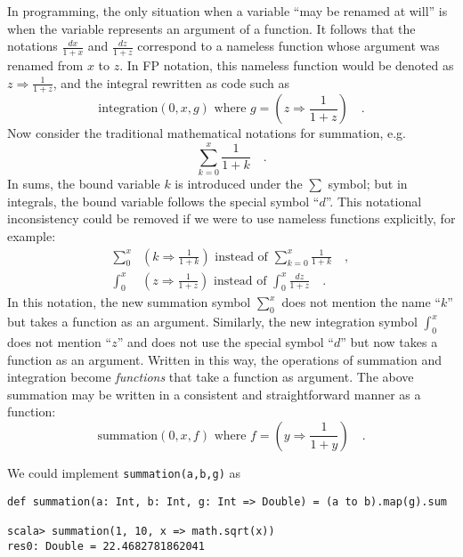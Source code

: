 In programming, the only situation when a variable ``may be renamed
at will'' is when the variable represents an argument of a function.
It follows that the notations $\frac{dx}{1+x}$ and $\frac{dz}{1+z}$
correspond to a nameless function whose argument was renamed from
$x$ to $z$. In FP notation, this nameless function would be denoted
as $z\Rightarrow\frac{1}{1+z}$, and the integral rewritten as code
such as
\[
\text{integration}\left(0,x,g\right)\text{ where }g=\left(z\Rightarrow\frac{1}{1+z}\right)\quad.
\]
Now consider the traditional mathematical notations for summation,
e.g.
\[
\sum_{k=0}^{x}\frac{1}{1+k}\quad.
\]
In sums, the bound variable $k$ is introduced under the $\sum$ symbol;
but in integrals, the bound variable follows the special symbol ``$d$''.
This notational inconsistency could be removed if we were to use nameless
functions explicitly, for example:
\begin{align*}
\sum_{0}^{x} & \left(k\Rightarrow\frac{1}{1+k}\right)\text{ instead of }\sum_{k=0}^{x}\frac{1}{1+k}\quad,\\
\int_{0}^{x} & \left(z\Rightarrow\frac{1}{1+z}\right)\text{ instead of }\int_{0}^{x}\frac{dz}{1+z}\quad.
\end{align*}
In this notation, the new summation symbol $\sum_{0}^{x}$ does not
mention the name \textquotedblleft $k$\textquotedblright{} but takes
a function as an argument. Similarly, the new integration symbol $\int_{0}^{x}$
does not mention ``$z$'' and does not use the special symbol ``$d$''
but now takes a function as an argument. Written in this way, the
operations of summation and integration become \emph{functions} that
take a function as argument. The above summation may be written in
a consistent and straightforward manner as a function:
\[
\text{summation}\left(0,x,f\right)\text{ where }f=\left(y\Rightarrow\frac{1}{1+y}\right)\quad.
\]

We could implement \texttt{}\lstinline!summation(a,b,g)! as
\begin{lstlisting}
def summation(a: Int, b: Int, g: Int => Double) = (a to b).map(g).sum

scala> summation(1, 10, x => math.sqrt(x))
res0: Double = 22.4682781862041
\end{lstlisting}

